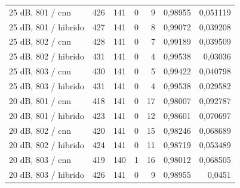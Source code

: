 \begin{longtable}{@{}p{.38\linewidth}rrrrrr@{}}
25 dB, 801 /\allowbreak{} cnn & 426 & 141 & 0 & 9 & 0,98955 & 0,051119\\
25 dB, 801 /\allowbreak{} hibrido & 427 & 141 & 0 & 8 & 0,99072 & 0,039208\\
25 dB, 802 /\allowbreak{} cnn & 428 & 141 & 0 & 7 & 0,99189 & 0,039509\\
25 dB, 802 /\allowbreak{} hibrido & 431 & 141 & 0 & 4 & 0,99538 & 0,03036\\
25 dB, 803 /\allowbreak{} cnn & 430 & 141 & 0 & 5 & 0,99422 & 0,040798\\
25 dB, 803 /\allowbreak{} hibrido & 431 & 141 & 0 & 4 & 0,99538 & 0,029582\\
20 dB, 801 /\allowbreak{} cnn & 418 & 141 & 0 & 17 & 0,98007 & 0,092787\\
20 dB, 801 /\allowbreak{} hibrido & 423 & 141 & 0 & 12 & 0,98601 & 0,070697\\
20 dB, 802 /\allowbreak{} cnn & 420 & 141 & 0 & 15 & 0,98246 & 0,068689\\
20 dB, 802 /\allowbreak{} hibrido & 424 & 141 & 0 & 11 & 0,98719 & 0,053489\\
20 dB, 803 /\allowbreak{} cnn & 419 & 140 & 1 & 16 & 0,98012 & 0,068505\\
20 dB, 803 /\allowbreak{} hibrido & 426 & 141 & 0 & 9 & 0,98955 & 0,0451\\
\bottomrule\end{longtable}\normalsize

